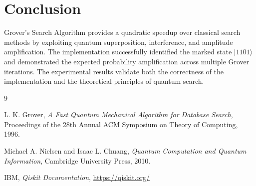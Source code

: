 \documentclass[12pt,a4paper]{article}
\begin{document}
\section{Conclusion}

Grover's Search Algorithm provides a quadratic speedup over classical search methods by exploiting quantum superposition, interference, and amplitude amplification. The implementation successfully identified the marked state $|1101\rangle$ and demonstrated the expected probability amplification across multiple Grover iterations. The experimental results validate both the correctness of the implementation and the theoretical principles of quantum search.

\begin{thebibliography}{9}

L. K. Grover,
\textit{A Fast Quantum Mechanical Algorithm for Database Search},
Proceedings of the 28th Annual ACM Symposium on Theory of Computing, 1996.

Michael A. Nielsen and Isaac L. Chuang,
\textit{Quantum Computation and Quantum Information},
Cambridge University Press, 2010.

IBM,
\textit{Qiskit Documentation},
\url{https://qiskit.org/}

\end{thebibliography}
\end{document}

